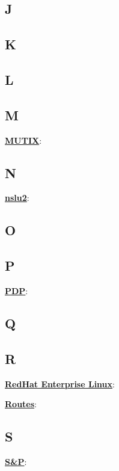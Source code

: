 \subsection{J}

\subsection{K}

\subsection{L}

\subsection{M}

\underline{\textbf{MUTIX}}: %

\subsection{N}

\underline{\textbf{nslu2}}: %

\subsection{O}

\subsection{P}

\underline{\textbf{PDP}}: %

\subsection{Q}

\subsection{R}

\underline{\textbf{RedHat Enterprise Linux}}: %

\underline{\textbf{Routes}}: %



\subsection{S}

\underline{\textbf{S&P}}: %

